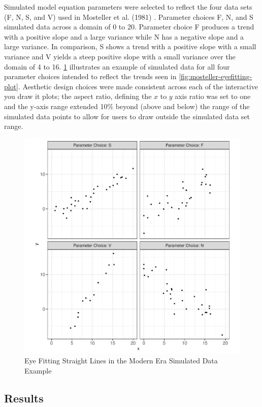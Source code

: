 \documentclass[print]{nuthesis}
\begin{document}
Simulated model equation parameters were selected to reflect the four data sets (F, N, S, and V) used in Mosteller et al. (1981) .
Parameter choices F, N, and S simulated data across a domain of 0 to 20.
Parameter choice F produces a trend with a positive slope and a large variance while N has a negative slope and a large variance.
In comparison, S shows a trend with a positive slope with a small variance and V yields a steep positive slope with a small variance over the domain of 4 to 16.
\cref{fig:eyefitting-simplot} illustrates an example of simulated data for all four parameter choices intended to reflect the trends seen in \cref{fig:mosteller-eyefitting-plot}.
Aesthetic design choices were made consistent across each of the interactive you draw it plots; the aspect ratio, defining the \(x\) to \(y\) axis ratio was set to one and the y-axis range extended 10\% beyond (above and below) the range of the simulated data points to allow for users to draw outside the simulated data set range.

\begin{figure}[tbp]

{\centering \includegraphics[width=0.75\linewidth,]{thesis_files/figure-latex/eyefitting-simplot-1} 

}

\caption{Eye Fitting Straight Lines in the Modern Era Simulated Data Example}\label{fig:eyefitting-simplot}
\end{figure}

\hypertarget{results-1}{%
\subsection{Results}\label{results-1}}
\end{document}
